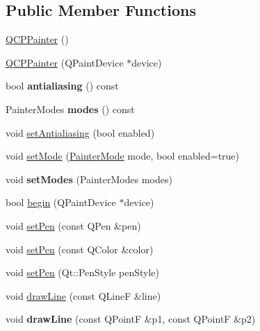 \subsection*{Public Member Functions}
\begin{DoxyCompactItemize}
\item 
\hyperlink{class_q_c_p_painter_a3c52cb0f43f34573d29bea487da28fe8}{Q\+C\+P\+Painter} ()
\item 
\hyperlink{class_q_c_p_painter_ae58dbb1795ddc4351ab324dc9898aa22}{Q\+C\+P\+Painter} (Q\+Paint\+Device $\ast$device)
\item 
bool {\bfseries antialiasing} () const \hypertarget{class_q_c_p_painter_a13370d7996315a7150be2fc868da3d4a}{}\label{class_q_c_p_painter_a13370d7996315a7150be2fc868da3d4a}

\item 
Painter\+Modes {\bfseries modes} () const \hypertarget{class_q_c_p_painter_a99b89eaf5363faaa1e1e6162856f436c}{}\label{class_q_c_p_painter_a99b89eaf5363faaa1e1e6162856f436c}

\item 
void \hyperlink{class_q_c_p_painter_aaba1deb9188244d9ea65b035112b4d05}{set\+Antialiasing} (bool enabled)
\item 
void \hyperlink{class_q_c_p_painter_af6b1f7d2bbc548b10aa55d8b6ad49577}{set\+Mode} (\hyperlink{class_q_c_p_painter_a156cf16444ff5e0d81a73c615fdb156d}{Painter\+Mode} mode, bool enabled=true)
\item 
void {\bfseries set\+Modes} (Painter\+Modes modes)\hypertarget{class_q_c_p_painter_a5fac93adc29c7c4dea9f3e171e9e635e}{}\label{class_q_c_p_painter_a5fac93adc29c7c4dea9f3e171e9e635e}

\item 
bool \hyperlink{class_q_c_p_painter_a0a41146ccd619dceab6e25ec7b46b044}{begin} (Q\+Paint\+Device $\ast$device)
\item 
void \hyperlink{class_q_c_p_painter_af9c7a4cd1791403901f8c5b82a150195}{set\+Pen} (const Q\+Pen \&pen)
\item 
void \hyperlink{class_q_c_p_painter_a5c4d88f21564e156e88ef807f7cf0003}{set\+Pen} (const Q\+Color \&color)
\item 
void \hyperlink{class_q_c_p_painter_a25e76095aae41da0d08035060e5f81ca}{set\+Pen} (Qt\+::\+Pen\+Style pen\+Style)
\item 
void \hyperlink{class_q_c_p_painter_a0b4b1b9bd495e182c731774dc800e6e0}{draw\+Line} (const Q\+LineF \&line)
\item 
void {\bfseries draw\+Line} (const Q\+PointF \&p1, const Q\+PointF \&p2)\hypertarget{class_q_c_p_painter_ad1638db27929491b3f1beb74d6cbad5e}{}\label{class_q_c_p_painter_ad1638db27929491b3f1beb74d6cbad5e}


\end{DoxyCompactItemize}
